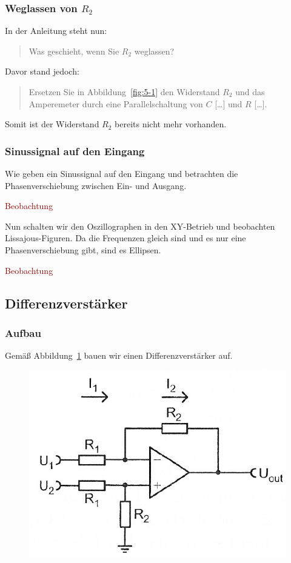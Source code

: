 \subsubsection{Weglassen von $R_2$}

In der Anleitung steht nun:

\begin{quote}
	Was geschieht, wenn Sie $R_2$ weglassen?
\end{quote}

Davor stand jedoch:

\begin{quote}
	Ersetzen Sie in Abbildung~\ref{fig:5-1} den Widerstand $R_2$ und das
	Amperemeter durch eine Parallelschaltung von $C$ […] und $R$ […].
\end{quote}

Somit ist der Widerstand $R_2$ bereits nicht mehr vorhanden.

\subsubsection{Sinussignal auf den Eingang}

Wie geben ein Sinussignal auf den Eingang und betrachten die Phasenverschiebung
zwischen Ein- und Ausgang.

\textcolor{darkred}{Beobachtung}

Nun schalten wir den Oszillographen in den XY-Betrieb und beobachten
Lissajous-Figuren. Da die Frequenzen gleich sind und es nur eine
Phasenverschiebung gibt, sind es Ellipsen.

\textcolor{darkred}{Beobachtung}

\FloatBarrier
\subsection{Differenzverstärker}

\subsubsection{Aufbau}

Gemäß Abbildung~\ref{fig:5_6-7} bauen wir einen Differenzverstärker auf.

\begin{figure}[htbp]
	\centering
	\includegraphics[width=.6\linewidth]{Anleitung/5_6-7.png}
	\caption{%
		\cite[Abbildung~5/6.7]{physik313-Anleitung}
	}
	\label{fig:5_6-7}
\end{figure}


